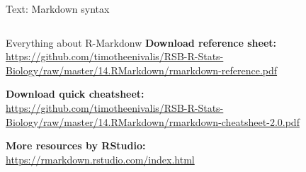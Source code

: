 \documentclass[10pt]{beamer}\usepackage[]{graphicx}\usepackage[]{color}
\begin{document}
\begin{frame}{Text: Markdown syntax}
  \begin{columns}
    \begin{column}{0.5\textwidth} 
    \end{column}
    \begin{column}{0.5\textwidth}
    \end{column}
\end{columns}
\end{frame}

\begin{frame}{Everything about R-Markdonw}
\textbf{Download reference sheet:}\\
\url{https://github.com/timotheenivalis/RSB-R-Stats-Biology/raw/master/14.RMarkdown/rmarkdown-reference.pdf}

\textbf{Download quick cheatsheet:}\\
\url{https://github.com/timotheenivalis/RSB-R-Stats-Biology/raw/master/14.RMarkdown/rmarkdown-cheatsheet-2.0.pdf}

\textbf{More resources by RStudio:}\\
\url{https://rmarkdown.rstudio.com/index.html}

\end{frame}
\end{document}
